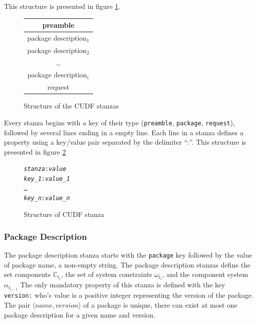 This structure is presented in figure \ref{formal:cudfstruct}.

\begin{figure}[htp]
\centering
\begin{tabular}{|c|}
\hline preamble \\ \hline
\hline package description$_{1}$ \\ \hline
\hline package description$_{2}$ \\ \hline
 \multicolumn{1}{c}{\ldots}  \\ 
\hline package description$_{i}$\\ \hline
\hline request\\ \hline
\end{tabular}
\caption{Structure of the CUDF stanzas}
\label{formal:cudfstruct}
\end{figure}

Every stanza begins with a key of their type (\verb+preamble+, \verb+package+, \verb+request+), followed by several lines ending in a empty line.
Each line in a stanza defines a property using a key/value pair separated by the delimiter ``:''.
This structure is presented in figure \ref{formal.cudfstanza}

\begin{figure}[htp] 
\begin{center}
\begin{alltt}
\textit{stanza}: \textit{value}
\textit{key_1}: \textit{value_1}
\ldots
\textit{key_n}: \textit{value_n}
\end{alltt}
  \caption{Structure of  CUDF stanza}
  \label{formal.cudfstanza}
\end{center}
\end{figure}

\subsubsection{Package Description}
The package description stanza starts with the \verb+package+ key followed by the value of package name, a non-empty string.
The package description stanzas define the set components $\mathbb{C}_{t_i}$, the set of system constraints $\omega_{t_i}$, and the component system $\alpha_{t_{i-1}}$
The only mandatory property of this stanza is defined with the key \verb+version:+ who's value is a positive integer representing the version of the package.
The pair $\langle name, version \rangle$ of a package is unique, there can exist at most one package description for a given name and version.

